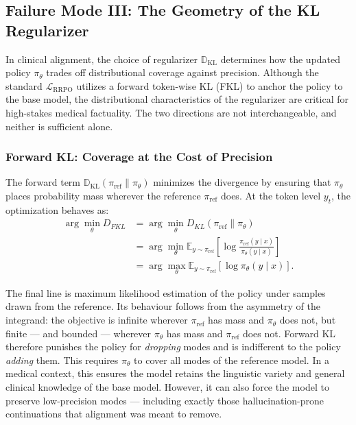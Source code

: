 \subsection{Failure Mode III: The Geometry of the KL Regularizer}
\label{sec:ana:kl}

In clinical alignment, the choice of regularizer $\mathbb{D}_{\text{KL}}$ determines how the updated policy $\pi_\theta$ trades off distributional coverage against precision. Although the standard $\mathcal{L}_{\text{RRPO}}$ utilizes a forward token-wise KL (FKL) to anchor the policy to the base model, the distributional characteristics of the regularizer are critical for high-stakes medical factuality. The two directions are not interchangeable, and neither is sufficient alone.

\subsubsection{Forward KL: Coverage at the Cost of Precision}

The forward term $\mathbb{D}_{\text{KL}}(\pi_{\text{ref}} \parallel \pi_\theta)$ minimizes the divergence by ensuring that $\pi_\theta$ places probability mass wherever the reference $\pi_{\text{ref}}$ does. At the token level $y_t$, the optimization behaves as:
\begin{equation*}
\begin{split}
\arg \min_{\theta} D_{FKL} &= \arg \min_{\theta} D_{KL}(\pi_{\text{ref}} \parallel \pi_\theta) \\
&= \arg \min_{\theta} \mathbb{E}_{y \sim \pi_{\text{ref}}} \left[ \log \frac{\pi_{\text{ref}}(y \mid x)}{\pi_\theta(y \mid x)} \right] \\
&= \arg \max_{\theta} \mathbb{E}_{y \sim \pi_{\text{ref}}} [\log \pi_\theta(y \mid x)].
\end{split}
\end{equation*}

The final line is maximum likelihood estimation of the policy under samples drawn from the reference. Its behaviour follows from the asymmetry of the integrand: the objective is infinite wherever $\pi_{\text{ref}}$ has mass and $\pi_\theta$ does not, but finite --- and bounded --- wherever $\pi_\theta$ has mass and $\pi_{\text{ref}}$ does not. Forward KL therefore punishes the policy for \emph{dropping} modes and is indifferent to the policy \emph{adding} them. This requires $\pi_\theta$ to cover all modes of the reference model. In a medical context, this ensures the model retains the linguistic variety and general clinical knowledge of the base model. However, it can also force the model to preserve low-precision modes --- including exactly those hallucination-prone continuations that alignment was meant to remove.

